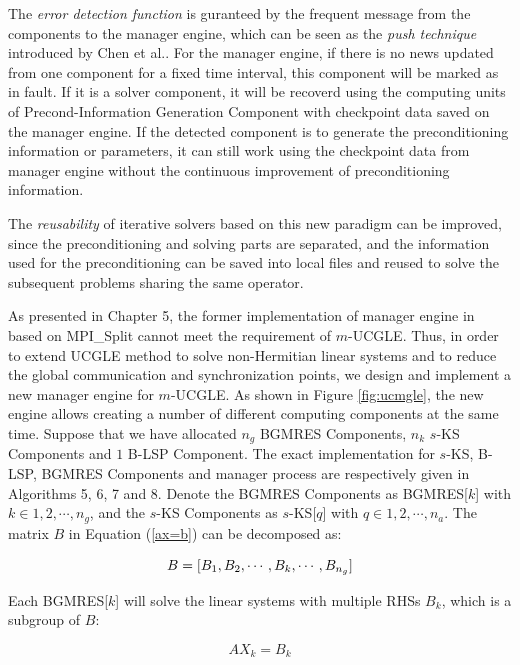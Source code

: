 The \textit{error detection function} is guranteed by the frequent message from the components to the manager engine, which can be seen as the \textit{push technique} introduced by Chen et al.\cite{chen2002quality}. For the manager engine, if there is no news updated from one component for a fixed time interval, this component will be marked as in fault. If it is a solver component, it will be recoverd using the computing units of Precond-Information Generation Component with checkpoint data saved on the manager engine. If the detected component is to generate the preconditioning information or parameters, it can still work using the checkpoint data from manager engine without the continuous improvement of preconditioning information.

The \textit{reusability} of iterative solvers based on this new paradigm can be improved, since the preconditioning and solving parts are separated, and the information used for the preconditioning can be saved into local files and reused to solve the subsequent problems sharing the same operator. 

As presented in Chapter 5, the former implementation of manager engine in \cite{wu2018distributed} based on MPI\_Split cannot meet the requirement of $m$-UCGLE. Thus, in order to extend UCGLE method to solve non-Hermitian linear systems and to reduce the global communication and synchronization points, we design and implement a new manager engine for $m$-UCGLE. As shown in Figure \ref{fig:ucmgle}, the new engine allows creating a number of different computing components at the same time. Suppose that we have allocated $n_g$ BGMRES Components, $n_k$ $s$-KS Components and $1$ B-LSP Component. The exact implementation for $s$-KS, B-LSP, BGMRES Components and manager process are respectively given in Algorithms 5, 6, 7 and 8. Denote the BGMRES Components as BGMRES[$k$] with $k \in 1, 2, \cdots, n_g$, and the $s$-KS Components as $s$-KS[$q$] with $q \in 1, 2, \cdots, n_a$.   The matrix $B$ in Equation (\ref{ax=b}) can be decomposed as:

\begin{equation}
B = [B_1, B_2, \cdots, B_k, \cdots, B_{n_g}] ~\\
\end{equation}

Each BGMRES[$k$] will solve the linear systems with multiple RHSs $B_k$, which is a subgroup of $B$:

\begin{equation}
\label{eq_sub}
AX_k = B_k
\end{equation}

